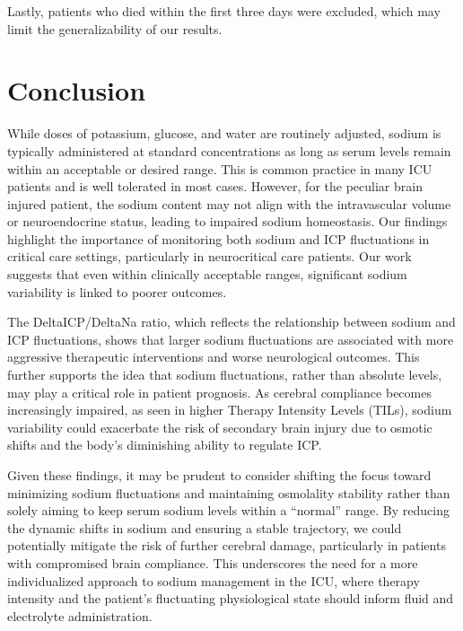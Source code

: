 Lastly, patients who died within the first three days were excluded, which may limit the generalizability of our results.


\section{Conclusion}
While doses of potassium, glucose, and water are routinely adjusted, sodium is typically administered at standard concentrations as long as serum levels remain within an acceptable or desired range. This is common practice in many ICU patients and is well tolerated in most cases. However, for the peculiar brain injured patient, the sodium content may not align with the intravascular volume or neuroendocrine status, leading to impaired sodium homeostasis. 
Our findings highlight the importance of monitoring both sodium and ICP fluctuations in critical care settings, particularly in neurocritical care patients. Our work suggests that even within clinically acceptable ranges, significant sodium variability is linked to poorer outcomes.

The DeltaICP/DeltaNa ratio, which reflects the relationship between sodium and ICP fluctuations, shows that larger sodium fluctuations are associated with more aggressive therapeutic interventions and worse neurological outcomes. This further supports the idea that sodium fluctuations, rather than absolute levels, may play a critical role in patient prognosis. As cerebral compliance becomes increasingly impaired, as seen in higher Therapy Intensity Levels (TILs), sodium variability could exacerbate the risk of secondary brain injury due to osmotic shifts and the body’s diminishing ability to regulate ICP.

Given these findings, it may be prudent to consider shifting the focus toward minimizing sodium fluctuations and maintaining osmolality stability rather than solely aiming to keep serum sodium levels within a “normal” range. By reducing the dynamic shifts in sodium and ensuring a stable trajectory, we could potentially mitigate the risk of further cerebral damage, particularly in patients with compromised brain compliance. This underscores the need for a more individualized approach to sodium management in the ICU, where therapy intensity and the patient’s fluctuating physiological state should inform fluid and electrolyte administration.




